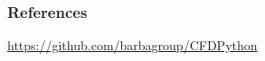 %
%
%

%
%
%
%


\begin{frame}
  \frametitle{References}
  \begin{center}
    \huge \url{https://github.com/barbagroup/CFDPython}
  \end{center}
\end{frame}
